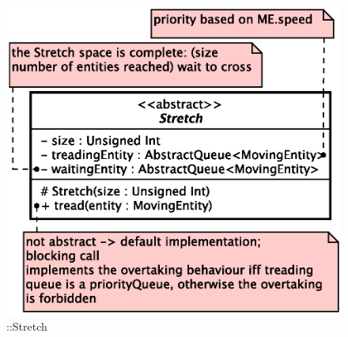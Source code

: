 \begin{figure}[h]
\centering
\includegraphics[scale=0.6,keepaspectratio]{images/solution/stretch.eps}
\caption{\pReactiveComponentStretch::Stretch}
\label{fig:sd-app-stretch}
\end{figure}
\FloatBarrier
